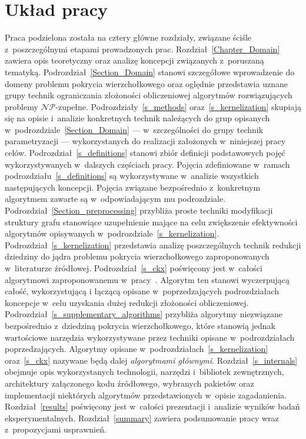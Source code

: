 \section{Układ pracy}\label{Section_Layout}
\par{
  Praca podzielona została na cztery główne rozdziały, związane ściśle z~poszczególnymi etapami prowadzonych prac.
  Rozdział~\ref{Chapter_Domain} zawiera opis teoretyczny oraz analizę koncepcji związanych z~poruszaną tematyką.
  Podrozdział~\ref{Section_Domain} stanowi szczegółowe wprowadzenie do domeny problemu pokrycia wierzchołkowego oraz oględnie przedstawia uznane grupy technik ograniczania złożoności obliczeniowej algorytmów rozwiązujących problemy $\mathcal{NP}$-zupełne.
  Podrozdziały~\ref{s_methods} oraz~\ref{s_kernelization} skupiają się na opisie i~analizie konkretnych technik należących do grup opisanych w~podrozdziale~\ref{Section_Domain} --- w~szczególności do grupy technik parametryzacji --- wykorzystanych do realizacji założonych w~niniejszej pracy celów.
  Podrozdział~\ref{s_definitions} stanowi zbiór definicji podstawowych pojęć wykorzystywanych w~dalszych częściach pracy.
  Pojęcia zdefiniowane w~ramach podrozdziału~\ref{s_definitions} są wykorzystywane w~analizie wszystkich następujących koncepcji.
  Pojęcia związane bezpośrednio z~konkretnym algorytmem zawarte są w~odpowiadającym mu podrozdziale.
  Podrozdział~\ref{Section_preprocessing} przybliża proste techniki modyfikacji struktury grafu stanowiące uzupełnienie mające na celu zwiększenie efektywności algorytmów opisywanych w~podrozdziale~\ref{s_kernelization}.
  Podrozdział~\ref{s_kernelization} przedstawia analizę poszczególnych technik redukcji dziedziny do jądra problemu pokrycia wierzchołkowego zaproponowanych w~literaturze źródłowej.
  Podrozdział~\ref{s_ckx} poświęcony jest w~całości algorytmowi zaproponowanemu w~pracy~\cite{ImprovedBounds10}.
  Algorytm ten stanowi wyczerpującą całość, wykorzystującą i łączącą opisane w~poprzedzających podrozdziałach koncepcje w~celu uzyskania dużej redukcji złożoności obliczeniowej.
  Podrozdział~\ref{s_supplementary_algorithms} przybliża algorytmy niezwiązane bezpośrednio z~dziedziną pokrycia wierzchołkowego, które stanowią jednak wartościowe narzędzia wykorzystywane przez techniki opisane w~podrozdziałach poprzedzających.
  Algorytmy opisane w~podrozdziałach~\ref{s_kernelization} oraz~\ref{s_ckx} nazywane będą dalej \emph{algorytmami głównymi}.
  Rozdział~\ref{s_internals} obejmuje opis wykorzystanych technologii, narzędzi i~bibliotek zewnętrznych, architektury załączonego kodu źródłowego, wybranych pakietów oraz implementacji niektórych algorytmów przedstawionych w~opisie zagadanienia.
  Rozdział~\ref{results} poświęcony jest w~całości prezentacji i~analizie wyników badań eksperymentalnych.
  Rozdział~\ref{summary} zawiera podsumowanie pracy wraz z~propozycjami usprawnień.
}
